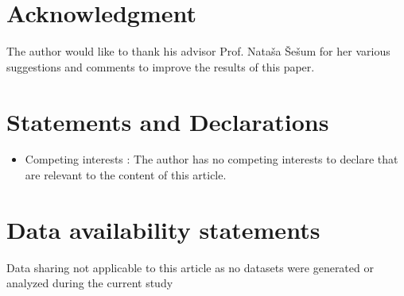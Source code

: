 \documentclass[pdflatex,sn-mathphys-num]{sn-jnl}%
\begin{document}
\section*{Acknowledgment}
The author would like to thank his advisor Prof. Nata\v sa \v Se\v sum for her various suggestions and comments to improve the results of this paper.
\section*{Statements and Declarations}
\begin{itemize}
    \item Competing interests : The author has no competing interests to declare that are
relevant to the content of this article.
\end{itemize}
\section*{Data availability statements}
Data sharing not applicable to this article as no datasets were generated or analyzed
during the current study
\printbibliography
\end{document}
